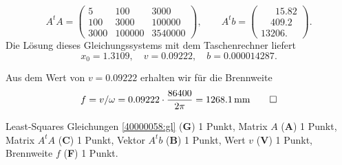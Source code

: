 \begin{loesung}
\begin{teilaufgaben}
\[
A^tA
=
\begin{pmatrix}
   5&   100&   3000\\
 100&  3000& 100000\\
3000&100000&3540000
\end{pmatrix},
\qquad
A^tb
=
\begin{pmatrix}
\phantom{000}15.82\\
\phantom{00}409.2\phantom{0}\\
13206.\phantom{00}
\end{pmatrix}.
\]
Die Lösung dieses Gleichungssystems mit dem Taschenrechner liefert
\[
x_0 = 1.3109,\quad
v=0.09222,\quad
b=0.000014287.
\]
\item
Aus dem Wert von $v=0.09222$ erhalten wir für die Brennweite
\[
f
=
v/\omega
=
0.09222\cdot \frac{86400}{2\pi}
=
1268.1\, \text{mm}
\qedhere
\]
\end{teilaufgaben}
\end{loesung}


\begin{bewertung}
Least-Squares Gleichungen \eqref{40000058:gl} ({\bf G}) 1 Punkt,
Matrix $A$ ({\bf A}) 1 Punkt,
Matrix $A^tA$ ({\bf C}) 1 Punkt,
Vektor $A^tb$ ({\bf B}) 1 Punkt,
Wert $v$ ({\bf V}) 1 Punkt,
Brennweite $f$ ({\bf F}) 1 Punkt.
\end{bewertung}
